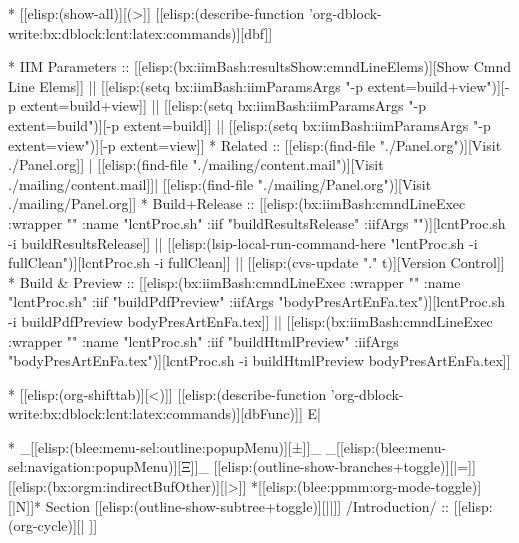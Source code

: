 \begin{whenOrg}
* [[elisp:(show-all)][(>]] [[elisp:(describe-function 'org-dblock-write:bx:dblock:lcnt:latex:commands)][dbf]]
\begin{whenOrg}
*      IIM Parameters    ::  [[elisp:(bx:iimBash:resultsShow:cmndLineElems)][Show Cmnd Line Elems]] || [[elisp:(setq bx:iimBash:iimParamsArgs "-p extent=build+view")][-p extent=build+view]] || [[elisp:(setq bx:iimBash:iimParamsArgs "-p extent=build")][-p extent=build]] || [[elisp:(setq bx:iimBash:iimParamsArgs "-p extent=view")][-p extent=view]]
*      Related           ::  [[elisp:(find-file "./Panel.org")][Visit ./Panel.org]] | [[elisp:(find-file "./mailing/content.mail")][Visit ./mailing/content.mail]]| [[elisp:(find-file "./mailing/Panel.org")][Visit ./mailing/Panel.org]]
*      Build+Release     ::  [[elisp:(bx:iimBash:cmndLineExec :wrapper "" :name "lcntProc.sh" :iif "buildResultsRelease" :iifArgs "")][lcntProc.sh -i buildResultsRelease]] || [[elisp:(lsip-local-run-command-here "lcntProc.sh -i fullClean")][lcntProc.sh -i fullClean]] || [[elisp:(cvs-update "." t)][Version Control]]
*      Build & Preview   ::  [[elisp:(bx:iimBash:cmndLineExec :wrapper "" :name "lcntProc.sh" :iif "buildPdfPreview" :iifArgs "bodyPresArtEnFa.tex")][lcntProc.sh -i buildPdfPreview bodyPresArtEnFa.tex]] || [[elisp:(bx:iimBash:cmndLineExec :wrapper "" :name "lcntProc.sh" :iif "buildHtmlPreview" :iifArgs "bodyPresArtEnFa.tex")][lcntProc.sh -i buildHtmlPreview bodyPresArtEnFa.tex]]

* [[elisp:(org-shifttab)][<)]] [[elisp:(describe-function 'org-dblock-write:bx:dblock:lcnt:latex:commands)][dbFunc)]]  E|
\end{whenOrg}

\begin{whenOrg}
*  _[[elisp:(blee:menu-sel:outline:popupMenu)][±]]_ _[[elisp:(blee:menu-sel:navigation:popupMenu)][Ξ]]_ [[elisp:(outline-show-branches+toggle)][|=]] [[elisp:(bx:orgm:indirectBufOther)][|>]] *[[elisp:(blee:ppmm:org-mode-toggle)][|N]]*  Section    [[elisp:(outline-show-subtree+toggle)][||]]   /Introduction/ ::  [[elisp:(org-cycle)][| ]]
\end{whenOrg}


\end{whenOrg}
